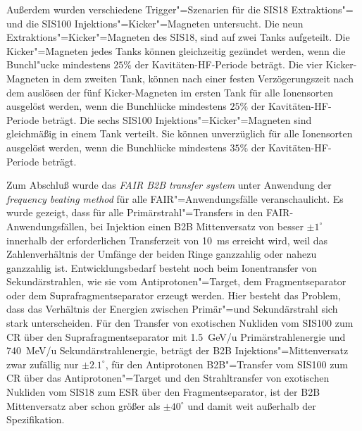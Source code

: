 Au\ss{}erdem wurden verschiedene Trigger"=Szenarien für die SIS18 Extraktions"= und die SIS100 Injektions"=Kicker"=Magneten untersucht. Die neun Extraktions"=Kicker"=Magneten des SIS18, sind auf zwei Tanks aufgeteilt. Die Kicker"=Magneten jedes Tanks k\"onnen gleichzeitig gez\"undet werden, wenn die Bunchl"ucke mindestens $25\%$ der Kavit\"aten-HF-Periode beträgt. Die vier Kicker-Magneten in dem zweiten Tank, k\"onnen nach einer festen Verz\"ogerungszeit nach dem ausl\"osen der f\"unf Kicker-Magneten im ersten Tank f\"ur alle Ionensorten ausgel\"ost werden, wenn die Bunchl\"ucke mindestens $25\%$ der Kavit\"aten-HF-Periode betr\"agt. Die sechs SIS100 Injektions"=Kicker"=Magneten sind gleichm\"a\ss{}ig in einem Tank verteilt. Sie k\"onnen unverz\"uglich f\"ur alle Ionensorten ausgel\"ost werden, wenn die Bunchl\"ucke mindestens $35\%$ der Kavitäten-HF-Periode betr\"agt.  

Zum Abschlu\ss{} wurde das \textit{FAIR B2B transfer system} unter Anwendung der  \textit{frequency beating method} f\"ur alle FAIR"=Anwendungsf\"alle veranschaulicht. Es wurde gezeigt, dass f\"ur alle Prim\"arstrahl"=Transfers in den FAIR-Anwendungsf\"allen, bei Injektion einen B2B Mittenversatz von besser $\pm1^\circ$ innerhalb der erforderlichen Transferzeit von \SI{10}{\ms} erreicht wird, weil das Zahlenverh\"altnis der Umf\"ange der beiden Ringe ganzzahlig oder nahezu ganzzahlig ist. Entwicklungsbedarf besteht noch beim Ionentransfer von Sekund\"arstrahlen, wie sie vom Antiprotonen"=Target, dem Fragmentseparator oder dem Suprafragmentseparator erzeugt werden. Hier besteht das Problem, dass das Verh\"altnis der Energien zwischen Prim\"ar"=und
Sekund\"arstrahl sich stark unterscheiden. F\"ur den Transfer von exotischen Nukliden vom SIS100 zum CR \"uber den Suprafragmentseparator mit \SI{1.5}{GeV/u} Prim\"arstrahlenergie und \SI{740}{MeV/u} Sekund\"arstrahlenergie, betr\"agt der B2B Injektions"=Mittenversatz zwar zufällig nur $\pm2.1^\circ$, f\"ur den Antiprotonen B2B"=Transfer vom SIS100 zum CR \"uber das Antiprotonen"=Target und den Strahltransfer von exotischen Nukliden vom SIS18 zum ESR \"uber den Fragmentseparator, ist der B2B Mittenversatz aber schon gr\"o\ss{}er als $\pm40^\circ$ und damit weit au\ss{}erhalb der Spezifikation.

